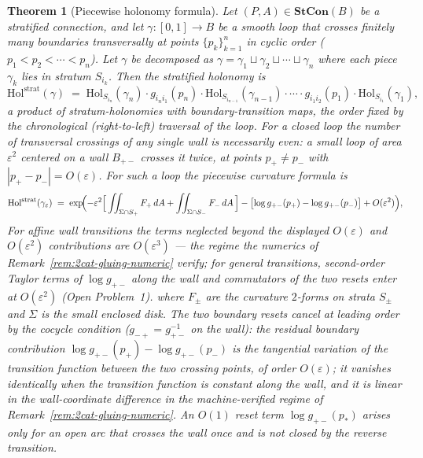 \documentclass[11pt,a4paper]{article}
\theoremstyle{plain}
\newtheorem{theorem}{Theorem}[section]
\theoremstyle{definition}
\theoremstyle{remark}
\begin{document}
\begin{theorem}[Piecewise holonomy formula]
\label{thm:stratified-holonomy}
Let $(P, A) \in \mathbf{StCon}(B)$ be a stratified connection, and let
$\gamma : [0, 1] \to B$ be a smooth loop that crosses finitely many
boundaries transversally at points $\{p_k\}_{k=1}^n$ in cyclic order
($p_1 < p_2 < \cdots < p_n$). Let $\gamma$ be decomposed as
$\gamma = \gamma_1 \sqcup \gamma_2 \sqcup \cdots \sqcup \gamma_n$
where each piece $\gamma_k$ lies in stratum $S_{i_k}$. Then the
stratified holonomy is
\begin{equation}\label{eq:strat-holonomy}
  \mathrm{Hol}^{\mathrm{strat}}(\gamma) \;=\;
  \mathrm{Hol}_{S_{i_n}}(\gamma_n) \cdot g_{i_n i_1}(p_n) \cdot
  \mathrm{Hol}_{S_{i_{n-1}}}(\gamma_{n-1}) \cdot \cdots \cdot
  g_{i_1 i_2}(p_1) \cdot \mathrm{Hol}_{S_{i_1}}(\gamma_1),
\end{equation}
a product of stratum-holonomies with boundary-transition maps, the
order fixed by the chronological (right-to-left) traversal of the
loop. For a \emph{closed} loop the number of transversal crossings of
any single wall is necessarily even: a small loop of area
$\varepsilon^2$ centered on a wall $B_{+-}$ crosses it twice, at
points $p_+ \neq p_-$ with $|p_+ - p_-| = O(\varepsilon)$. For such a
loop the piecewise curvature formula is
\begin{equation}\label{eq:piecewise-F}
  \mathrm{Hol}^{\mathrm{strat}}(\gamma_\varepsilon) \;=\;
  \exp\!\Bigl(-\varepsilon^2\Bigl[\,\iint_{\Sigma \cap S_+} F_+\,
  dA + \iint_{\Sigma \cap S_-} F_-\, dA\,\Bigr]
  - \bigl[\log g_{+-}(p_+) - \log g_{+-}(p_-)\bigr]
  + O(\varepsilon^2)\Bigr),
\end{equation}
For affine wall transitions the terms neglected beyond the displayed
$O(\varepsilon)$ and $O(\varepsilon^2)$ contributions are
$O(\varepsilon^3)$ --- the regime the numerics of
Remark~\ref{rem:2cat-gluing-numeric} verify; for general
transitions, second-order Taylor terms of $\log g_{+-}$ along the
wall and commutators of the two resets enter at $O(\varepsilon^2)$
(Open Problem~1).
where $F_\pm$ are the curvature $2$-forms on strata $S_\pm$ and
$\Sigma$ is the small enclosed disk. The two boundary resets cancel
at leading order by the cocycle condition
($g_{-+} = g_{+-}^{-1}$ on the wall): the residual boundary
contribution $\log g_{+-}(p_+) - \log g_{+-}(p_-)$ is the
\emph{tangential variation} of the transition function between the
two crossing points, of order $O(\varepsilon)$; it vanishes identically
when the transition function is constant along the wall, and it is
linear in the wall-coordinate difference in the machine-verified
regime of Remark~\ref{rem:2cat-gluing-numeric}. An $O(1)$ reset term
$\log g_{+-}(p_*)$ arises only for an \emph{open arc} that crosses
the wall once and is not closed by the reverse transition.
\end{theorem}
\end{document}
